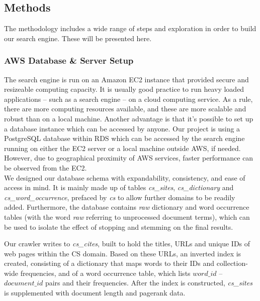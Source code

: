
\subsection{Methods} %
\label{sub:methods}
The methodology includes a wide range of steps and exploration in order to build our search engine. These will be presented here.

\subsubsection{AWS Database \& Server Setup} %
\label{ssub:database_and_server_setup}

The search engine is run on an Amazon EC2 instance that provided secure and resizeable computing capacity. It is usually good practice to run heavy loaded applications -- such as a search engine -- on a cloud computing service. As a rule, there are more computing resources available, and these are more scalable and robust than on a local machine. Another advantage is that it's possible to set up a database instance which can be accessed by anyone. Our project is using a PostgreSQL database within RDS which can be accessed by the search engine running on either the EC2 server or a local machine outside AWS, if needed. However, due to geographical proximity of AWS services, faster performance can be observed from the EC2.\\

We designed our database schema with expandability, consistency, and ease of access in mind. It is mainly made up of tables \emph{cs\_sites}, \emph{cs\_dictionary} and \emph{cs\_word\_occurrence}, prefaced by \emph{cs} to allow further domains to be readily added. Furthermore, the database contains \emph{raw} dictionary and word occurrence tables (with the word \emph{raw} referring to unprocessed document terms), which can be used to isolate the effect of stopping and stemming on the final results.

Our crawler writes to \emph{cs\_cites}, built to hold the titles, URLs and unique IDs of web pages within the CS domain.
Based on these URLs, an inverted index is created, consisting of a dictionary that maps words to their IDs and collection-wide frequencies, and of a word occurrence table, which lists $word\_id$ -- $document\_id$ pairs and their frequencies. After the index is constructed, \emph{cs\_sites} is supplemented with document length and pagerank data.

